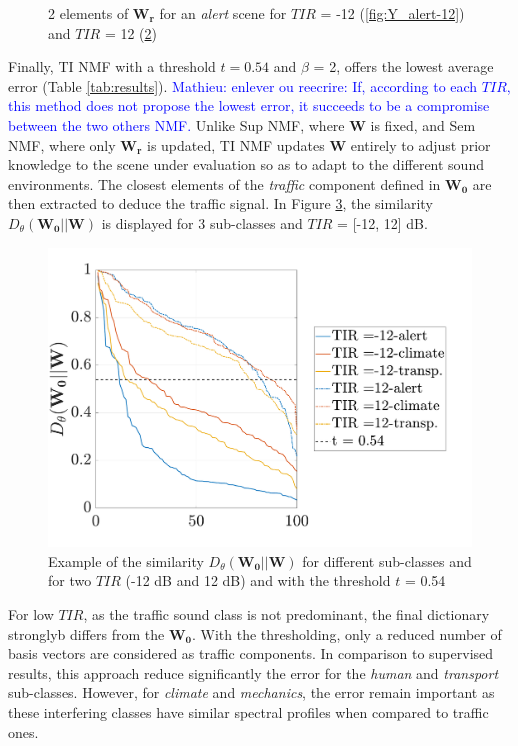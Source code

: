 \documentclass[twocolumn,a4paper,10pt]{article}
\newcommand{\ml}[1]{\textcolor{blue}{ Mathieu: #1}}
\begin{document}
\begin{figure}
\begin{subfigure}[t]{0.45\textwidth}
        \caption{}
		\label{fig:Y_alert_12}
    \end{subfigure}
    \caption{2 elements of $\mathbf{W_r}$ for an \textit{alert} scene for $TIR$ = -12 (\ref{fig:Y_alert-12}) and $TIR$ = 12 (\ref{fig:Y_alert_12})}
\end{figure}


Finally, TI NMF with a threshold $t = 0.54$ and $\beta$ = 2, offers the lowest average error (Table \ref{tab:results}). \ml{enlever ou reecrire: If, according to each $TIR$, this method does not propose the lowest error, it succeeds to be a compromise between the two others NMF.} Unlike Sup NMF, where $\mathbf{W}$ is fixed, and Sem NMF, where only $\mathbf{W_r}$ is updated, TI NMF updates $\mathbf{W}$ entirely to adjust prior knowledge to the scene under evaluation so as to adapt to the different sound environments. The closest elements of the \textit{traffic} component defined in $\mathbf{W_0}$ are then extracted to deduce the traffic signal. In Figure \ref{fig:dist_-12_12}, the similarity $D_{\theta}(\mathbf{W_0}||\mathbf{W})$ is displayed for 3 sub-classes and $TIR$ = [-12, 12] dB.

\begin{figure}[t]
    \centering
    \includegraphics[width=\linewidth]{figures/dist_-12_12.pdf}
    \caption{Example of the similarity $D_{\theta}\left( \mathbf{W_0} \vert \vert \mathbf{W}\right)$ for different sub-classes and for two $TIR$ (-12 dB and 12 dB) and with the threshold $t$ = 0.54}
    \label{fig:dist_-12_12}
\end{figure}

For low $TIR$, as the traffic sound class is not predominant, the final dictionary stronglyb differs from the $\mathbf{W_0}$. With the thresholding, only a reduced number of basis vectors are considered as traffic components. In comparison to supervised results, this approach reduce significantly the error for the \textit{human} and \textit{transport} sub-classes.  However, for \textit{climate} and \textit{mechanics}, the error remain important as these interfering classes have similar spectral profiles when compared to traffic ones.
\end{document}
